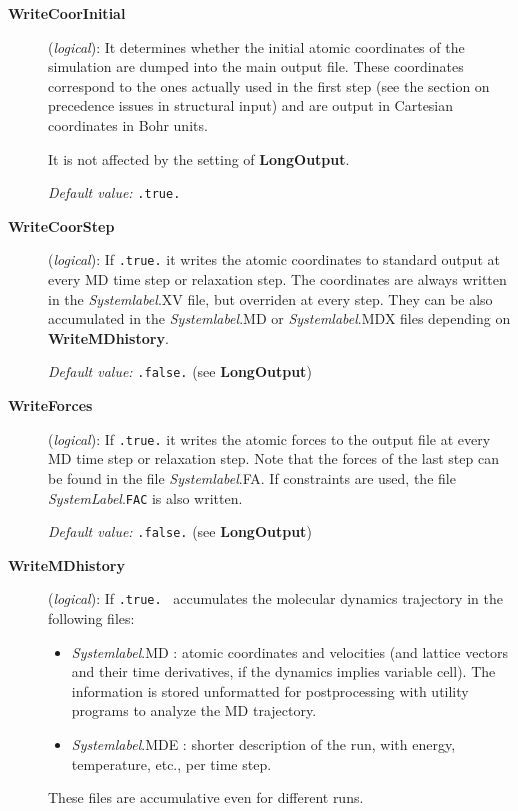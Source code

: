 \begin{description}
\item[\textbf{WriteCoorInitial}] (\textit{logical}):
It determines whether the initial atomic coordinates of the simulation are
dumped into the main output file. These coordinates correspond to the
ones actually used in the first step (see the section on precedence
issues in structural input) and are output in Cartesian coordinates in
Bohr units.

It is not affected by the setting of \textbf{LongOutput}.

\textit{Default value:} \texttt{.true.}


\item[\textbf{WriteCoorStep}] (\textit{logical}):   If \texttt{.true.} it writes the atomic coordinates to standard
  output at every MD time step or relaxation step. The coordinates are
  always written in the \textit{Systemlabel}.XV file, but overriden at
  every step. They can be also accumulated in the \textit{Systemlabel}.MD
  or \textit{Systemlabel}.MDX files depending on \textbf{WriteMDhistory}.


\textit{Default value:} \texttt{.false.} (see \textbf{LongOutput})


\item[\textbf{WriteForces}] (\textit{logical}):  If \texttt{.true.} it writes the
  atomic forces to the output file at every MD time step or relaxation
  step.  Note that the forces of the last step can be found in the
  file \textit{Systemlabel}.FA. If constraints are used, the file
   \textit{SystemLabel}.\texttt{FAC} is also written.


\textit{Default value:} \texttt{.false.} (see \textbf{LongOutput})

\item[\textbf{WriteMDhistory}] (\textit{logical}):
    If \texttt{.true.} \siesta\ accumulates the
  molecular dynamics trajectory in the following files:
\begin{itemize}
\item
\textit{Systemlabel}.MD : atomic coordinates and velocities (and lattice
vectors and their time derivatives, if the dynamics implies variable
cell). The information is stored unformatted for postprocessing with
utility programs to analyze the MD trajectory.
\item
\textit{Systemlabel}.MDE : shorter description of the run, with energy,
temperature, etc., per time step.
\end{itemize}
These files are accumulative even for different runs.


\end{description}
